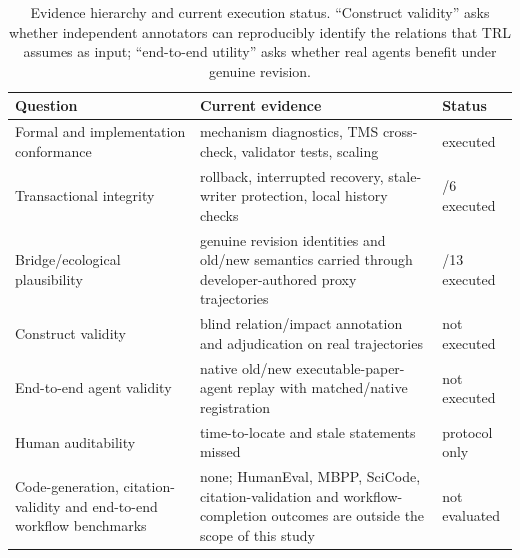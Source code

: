 \documentclass[cmc,article,submit,moreauthors,pdftex]{Definitions/tsp}
\begin{document}
\begin{table}[t]
\centering
\caption{Evidence hierarchy and current execution status. ``Construct validity'' asks whether independent annotators can reproducibly identify the relations that TRL assumes as input; ``end-to-end utility'' asks whether real agents benefit under genuine revision.}
\label{tab:hierarchy}
\scriptsize
\begin{tabularx}{\columnwidth}{>{\raggedright\arraybackslash}p{3.1cm}>{\raggedright\arraybackslash}X>{\raggedright\arraybackslash}p{1.8cm}}
\toprule
Question & Current evidence & Status \\
\midrule
Formal and implementation conformance & mechanism diagnostics, TMS cross-check, validator tests, scaling & executed \\
Transactional integrity & rollback, interrupted recovery, stale-writer protection, local history checks & 6/6 executed \\
Bridge/ecological plausibility & 13 genuine revision identities and old/new semantics carried through developer-authored proxy trajectories & 13/13 executed \\
Construct validity & blind relation/impact annotation and adjudication on real trajectories & not executed \\
End-to-end agent validity & native old/new executable-paper-agent replay with matched/native registration & not executed \\
Human auditability & time-to-locate and stale statements missed & protocol only \\
Code-generation, citation-validity and end-to-end workflow benchmarks & none; HumanEval, MBPP, SciCode, citation-validation and workflow-completion outcomes are outside the scope of this study & not evaluated \\
\bottomrule
\end{tabularx}
\end{table}
\end{document}
